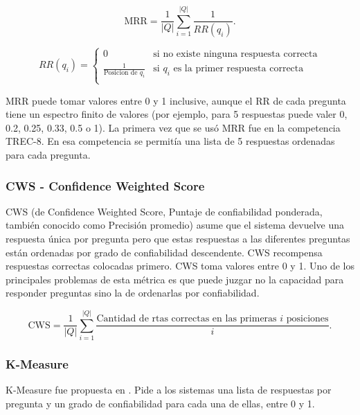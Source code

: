 \begin{equation}\label{eq:mrr}
 \text{MRR} = \frac{1}{|Q|} \sum_{i=1}^{|Q|} \frac{1}{RR(q_i)}. \!
\end{equation}

\begin{equation*}
    RR(q_i) = \begin{cases}
               0     & \text{si no existe ninguna respuesta correcta}\\
               \frac{1}{\text{Posicion de }q_i} & \text{si }q_i\text{ es la primer respuesta correcta}\\
           \end{cases}
\end{equation*}

MRR puede tomar valores entre 0 y 1 inclusive, aunque el RR de cada pregunta tiene un espectro finito de valores (por ejemplo, para 5 respuestas puede valer 0, 0.2, 0.25, 0.33, 0.5 o 1). La primera vez que se usó MRR fue en la competencia TREC-8. En esa competencia se permitía una lista de 5 respuestas ordenadas para cada pregunta.  


\subsubsection*{CWS - Confidence Weighted Score}
CWS (de Confidence Weighted Score, Puntaje de confiabilidad ponderada, también conocido como Precisión promedio) asume que el sistema devuelve una respuesta única por pregunta pero que estas respuestas a las diferentes preguntas están ordenadas por grado de confiabilidad descendente. 
CWS recompensa respuestas correctas colocadas primero. CWS toma valores entre 0 y 1.  Uno de los principales problemas de esta métrica es que puede juzgar no la capacidad para responder preguntas sino la de ordenarlas por confiabilidad.

\begin{equation}\label{eq:cws}
 \text{CWS} = \frac{1}{|Q|} \sum_{i=1}^{|Q|} \frac{\text{Cantidad de rtas correctas en las primeras $i$ posiciones}}{i}. \!
\end{equation}

 
\subsubsection*{K-Measure}
K-Measure fue propuesta en \cite{CLEF04}. Pide a los sistemas una lista de respuestas por pregunta y un grado de confiabilidad para cada una de ellas, entre 0 y 1. 

